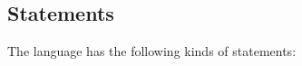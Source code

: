 \documentclass[11pt]{article}
\newcommand{\mathsc}[1]{\bm{\mathsf{#1}}}
\newcommand{\typebool}{\ensuremath{\mathsc{bool}}\xspace}
\newcommand{\typeint}{\ensuremath{\mathsc{int}}\xspace}
\newcommand{\exprlt}[2]{#1 < #2}
\newcommand{\exprgt}[2]{#1 > #2}
\newcommand{\exprle}[2]{#1 \leq #2}
\newcommand{\exprge}[2]{#1 \geq #2}
\newcommand{\expradd}[2]{#1 + #2}
\newcommand{\exprsub}[2]{#1 - #2}
\newcommand{\exprmul}[2]{#1 * #2}
\newcommand{\exprquo}[2]{#1 \mathbin{\mathsc{div}} #2}
\newcommand{\exprrem}[2]{#1 \mathbin{\mathsc{rem}} #2}
\newcommand{\exprneg}[1]{-#1}
\begin{document}





\subsection{Statements}

The language has the following kinds of statements:
\end{document}
